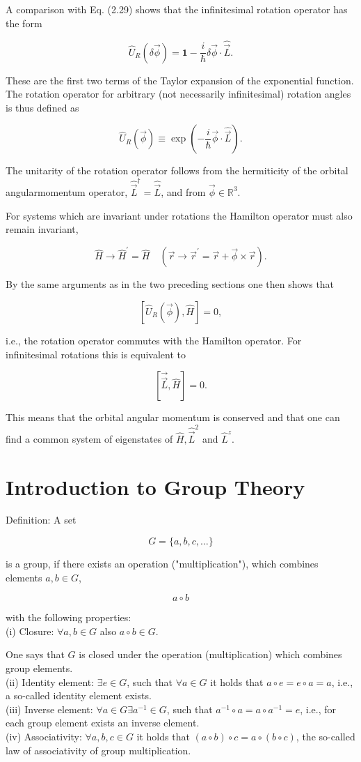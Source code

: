 \documentclass[10pt, letterpaper]{article}
\begin{document}
A comparison with Eq. (2.29) shows that the infinitesimal rotation operator has the form

$$
\hat{U}_{R}(\delta \vec{\phi})=\mathbf{1}-\frac{i}{\hbar} \delta \vec{\phi} \cdot \hat{\vec{L}} .
$$

These are the first two terms of the Taylor expansion of the exponential function. The rotation operator for arbitrary (not necessarily infinitesimal) rotation angles is thus defined as

$$
\hat{U}_{R}(\vec{\phi}) \equiv \exp \left(-\frac{i}{\hbar} \vec{\phi} \cdot \hat{\vec{L}}\right) .
$$

The unitarity of the rotation operator follows from the hermiticity of the orbital angularmomentum operator, $\hat{\vec{L}}^{\dagger}=\hat{\vec{L}}$, and from $\vec{\phi} \in \mathbb{R}^{3}$.

For systems which are invariant under rotations the Hamilton operator must also remain invariant,

$$
\hat{H} \longrightarrow \hat{H}^{\prime}=\hat{H} \quad\left(\vec{r} \longrightarrow \vec{r}^{\prime}=\vec{r}+\vec{\phi} \times \vec{r}\right) .
$$

By the same arguments as in the two preceding sections one then shows that

$$
\left[\hat{U}_{R}(\vec{\phi}), \hat{H}\right]=0,
$$

i.e., the rotation operator commutes with the Hamilton operator. For infinitesimal rotations this is equivalent to

$$
[\overrightarrow{\vec{L}}, \hat{H}]=0 .
$$

This means that the orbital angular momentum is conserved and that one can find a common system of eigenstates of $\hat{H}, \hat{\vec{L}}^{2}$ and $\hat{L}^{z}$.

\section{Introduction to Group Theory}
Definition: A set

$$
G=\{a, b, c, \ldots\}
$$

is a group, if there exists an operation ("multiplication"), which combines elements $a, b \in G$,

$$
a \circ b
$$

with the following properties:\\
(i) Closure: $\forall a, b \in G$ also $a \circ b \in G$.

One says that $G$ is closed under the operation (multiplication) which combines group elements.\\
(ii) Identity element: $\exists e \in G$, such that $\forall a \in G$ it holds that $a \circ e=e \circ a=a$, i.e., a so-called identity element exists.\\
(iii) Inverse element: $\forall a \in G \exists a^{-1} \in G$, such that $a^{-1} \circ a=a \circ a^{-1}=e$, i.e., for each group element exists an inverse element.\\
(iv) Associativity: $\forall a, b, c \in G$ it holds that $(a \circ b) \circ c=a \circ(b \circ c)$, the so-called law of associativity of group multiplication.
\end{document}
